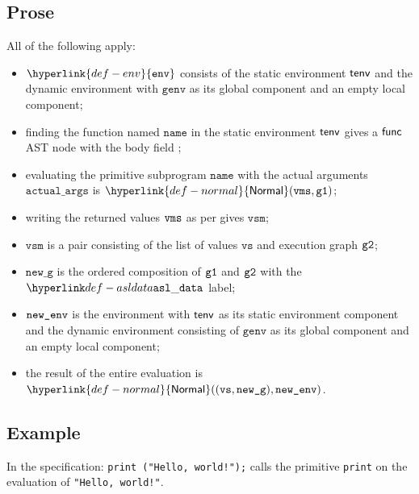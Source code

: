 \documentclass{book}
\newcommand\ErrorConfig[0]{\hyperlink{def-errorconfig}{\texttt{\#DE}}}
\newcommand\ProseOrError[0]{\ProseTerminateAs{\ErrorConfig}}
\newcommand\Normal[0]{\hyperlink{def-normal}{\textsf{Normal}}}
\newcommand\env[0]{\hyperlink{def-env}{\texttt{env}}}
\newcommand\newg[0]{\texttt{new\_g}}
\newcommand\vvs[0]{\texttt{vs}}
\newcommand\name[0]{\texttt{name}}
\newcommand\actualargs[0]{\texttt{actual\_args}}
\newcommand\genv[0]{\texttt{genv}}
\newcommand\vvsm[0]{\texttt{vsm}}
\begin{document}
\subsection{Prose}
All of the following apply:
\begin{itemize}
  \item $\env$ consists of the static environment $\textsf{tenv}$ and the dynamic environment with $\genv$ as its
        global component and an empty local component;
  \item finding the function named $\name$ in the static environment $\textsf{tenv}$ gives a $\textsf{func}$ AST node
        with the body field \SBPrimitive;
  \item evaluating the primitive subprogram $\name$ with the actual arguments $\actualargs$
        is $\Normal(\vms, \vgone)$\ProseOrError;
  \item writing the returned values $\texttt{vms}$ as per  gives $\vvsm$;
  \item $\vvsm$ is a pair consisting of the list of values $\vvs$ and execution graph $\texttt{g2}$;
  \item $\newg$ is the ordered composition of $\texttt{g1}$ and $\texttt{g2}$ with the $\asldata$ label;
  \item $\texttt{new\_env}$ is the environment with $\textsf{tenv}$ as its static environment component
        and the dynamic environment consisting of $\genv$ as its global component and an empty local component;
  \item the result of the entire evaluation is $\Normal((\vvs, \newg), \newenv)$.
\end{itemize}

\subsection{Example}
In the specification:
\texttt{print ("Hello, world!");} calls the primitive \texttt{print} on the evaluation of \texttt{"Hello, world!"}.

\end{document}
